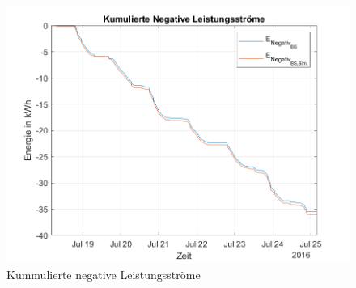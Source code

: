\begin{figure}[H]
    \centering
    \includegraphics[width=\textwidth]{Abbildungen/plot6.png}
    \caption{Kummulierte negative Leistungsströme}
    \label{fig:plot1_230730_3}
\end{figure}

